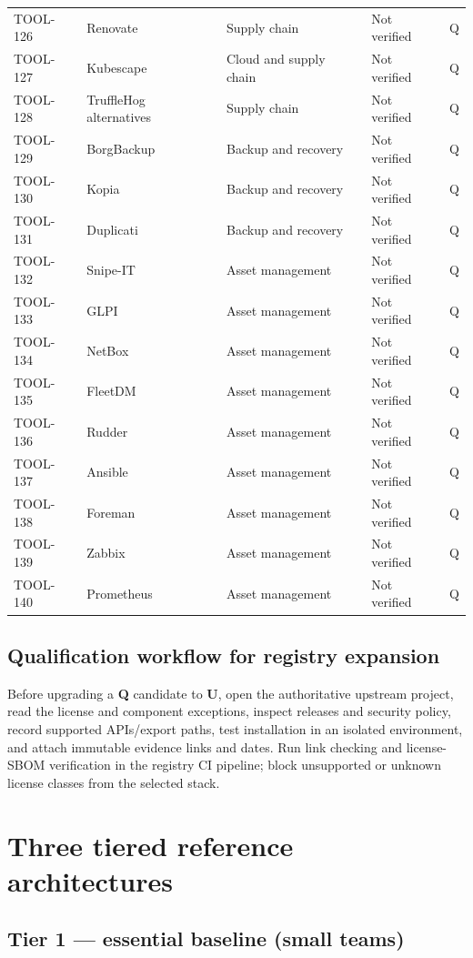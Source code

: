 \documentclass[11pt,oneside]{report}
\begin{document}
\begin{longtable}{P{0.10\textwidth}P{0.32\textwidth}P{0.22\textwidth}P{0.155\textwidth}P{0.055\textwidth}}
TOOL-126 & Renovate & Supply chain & Not verified & Q \\
TOOL-127 & Kubescape & Cloud and supply chain & Not verified & Q \\
TOOL-128 & TruffleHog alternatives & Supply chain & Not verified & Q \\
TOOL-129 & BorgBackup & Backup and recovery & Not verified & Q \\
TOOL-130 & Kopia & Backup and recovery & Not verified & Q \\
TOOL-131 & Duplicati & Backup and recovery & Not verified & Q \\
TOOL-132 & Snipe-IT & Asset management & Not verified & Q \\
TOOL-133 & GLPI & Asset management & Not verified & Q \\
TOOL-134 & NetBox & Asset management & Not verified & Q \\
TOOL-135 & FleetDM & Asset management & Not verified & Q \\
TOOL-136 & Rudder & Asset management & Not verified & Q \\
TOOL-137 & Ansible & Asset management & Not verified & Q \\
TOOL-138 & Foreman & Asset management & Not verified & Q \\
TOOL-139 & Zabbix & Asset management & Not verified & Q \\
TOOL-140 & Prometheus & Asset management & Not verified & Q \\
\bottomrule\end{longtable}\normalsize
\section{Qualification workflow for registry expansion}
Before upgrading a \textbf{Q} candidate to \textbf{U}, open the authoritative upstream project, read the license and component exceptions, inspect releases and security policy, record supported APIs/export paths, test installation in an isolated environment, and attach immutable evidence links and dates. Run link checking and license-SBOM verification in the registry CI pipeline; block unsupported or unknown license classes from the selected stack.

\chapter{Three tiered reference architectures}
\section{Tier 1 --- essential baseline (small teams)}
\end{document}
